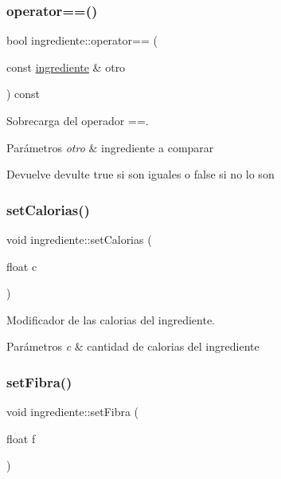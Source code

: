 \subsubsection{\texorpdfstring{operator==()}{operator==()}}
{\footnotesize\ttfamily bool ingrediente\+::operator== (\begin{DoxyParamCaption}\item[{const \hyperlink{classingrediente}{ingrediente} \&}]{otro }\end{DoxyParamCaption}) const}



Sobrecarga del operador ==. 


\begin{DoxyParams}{Parámetros}
{\em otro} & ingrediente a comparar \\
\hline
\end{DoxyParams}
\begin{DoxyReturn}{Devuelve}
devulte true si son iguales o false si no lo son 
\end{DoxyReturn}
\mbox{\label{classingrediente_af2f59af7fe9bf623fc6e9fa4e6da5fac}} 
\subsubsection{\texorpdfstring{set\+Calorias()}{setCalorias()}}
{\footnotesize\ttfamily void ingrediente\+::set\+Calorias (\begin{DoxyParamCaption}\item[{float}]{c }\end{DoxyParamCaption})}



Modificador de las calorias del ingrediente. 


\begin{DoxyParams}{Parámetros}
{\em c} & cantidad de calorias del ingrediente \\
\hline
\end{DoxyParams}
\mbox{\label{classingrediente_a13928358db435d4a42b348f6ea1ee548}} 
\subsubsection{\texorpdfstring{set\+Fibra()}{setFibra()}}
{\footnotesize\ttfamily void ingrediente\+::set\+Fibra (\begin{DoxyParamCaption}\item[{float}]{f }\end{DoxyParamCaption})}



